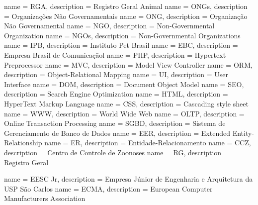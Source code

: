 %
%

{
  name = {RGA},
  description = {Registro Geral Animal}}
{
  name = {ONGs},
  description = {Organizações Não Governamentais}}
{
  name = {ONG},
  description = {Organização Não Governamental}}
{
  name = {NGO},
  description = {Non-Governmental Organization}}
{
  name = {NGOs},
  description = {Non-Governmental Organizations}}
{
  name = {IPB},
  description = {Instituto Pet Brasil}}
{
  name = {EBC},
  description = {Empresa Brasil de Comunicaçãol}}
{
  name = {PHP},
  description = {Hypertext Preprocessor}}
{
  name = {MVC},
  description = {Model View Controller}}			
{
  name = {ORM},
  description = {Object-Relational Mapping}}
{
  name = {UI},
  description = {User Interface}}
{
  name = {DOM},
  description = {Document Object Model}}
{
  name = {SEO},
  description = {Search Engine Optimization}}
{
  name = {HTML},
  description = {HyperText Markup Language}}
{
  name = {CSS},
  description = {Cascading style sheet}}
{
  name = {WWW},
  description = {World Wide Web}}
{
  name = {OLTP},
  description = {Online Transaction Processing}}
{
  name = {SGBD},
  description = {Sistema de Gerenciamento de Banco de Dados}}
{
  name = {EER},
  description = {Extended Entity-Relationship}}
{
  name = {ER},
  description = {Entidade-Relacionamento}}
{
  name = {CCZ},
  description = {Centro de Controle de Zoonoses}}
{
  name = {RG},
  description = {Registro Geral}}						

{
  name = {EESC Jr},
  description = {Empresa Júnior de Engenharia e Arquitetura da USP São Carlos}}
{
  name = {ECMA},
  description = {European Computer Manufacturers Association}}

